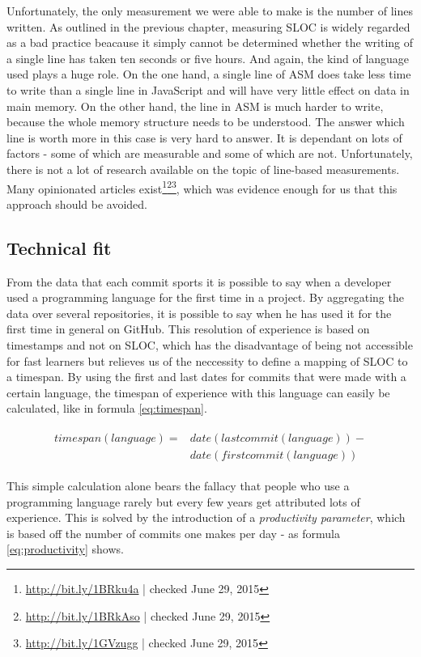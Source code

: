Unfortunately, the only measurement we were able to make is the number of lines written. As outlined in the previous chapter, measuring SLOC is widely regarded as a bad practice beacause it simply cannot be determined whether the writing of a single line has taken ten seconds or five hours. And again, the kind of language used plays a huge role. On the one hand, a single line of ASM does take less time to write than a single line in JavaScript and will have very little effect on data in main memory. On the other hand, the line in ASM is much harder to write, because the whole memory structure needs to be understood. The answer which line is worth more in this case is very hard to answer. It is dependant on lots of factors - some of which are measurable and some of which are not. Unfortunately, there is not a lot of research available on the topic of line-based measurements. Many opinionated articles exist\cite{mlya:2012}\footnote{\url{http://bit.ly/1BRku4a} | checked June 29, 2015}\footnote{\url{http://bit.ly/1BRkAso} | checked June 29, 2015}\footnote{\url{http://bit.ly/1GVzugg} | checked June 29, 2015}, which was evidence enough for us that this approach should be avoided.

\subsection{Technical fit}\label{sec:technicalfit}
From the data that each commit sports it is possible to say when a developer used a programming language for the first time in a project. By aggregating the data over several repositories, it is possible to say when he has used it for the first time in general on GitHub. This resolution of experience is based on timestamps and not on SLOC, which has the disadvantage of being not accessible for fast learners but relieves us of the neccessity to define a mapping of SLOC to a timespan. By using the first and last dates for commits that were made with a certain language, the timespan of experience with this language can easily be calculated, like in formula \ref{eq:timespan}.

\begin{align}
\begin{split}\label{eq:timespan}
timespan(language) ={}& date(lastcommit(language)) - \\
                      & date(firstcommit(language))
\end{split}
\end{align}

This simple calculation alone bears the fallacy that people who use a programming language rarely but every few years get attributed lots of experience. This is solved by the introduction of a \textit{productivity parameter}, which is based off the number of commits one makes per day - as formula \ref{eq:productivity} shows.

